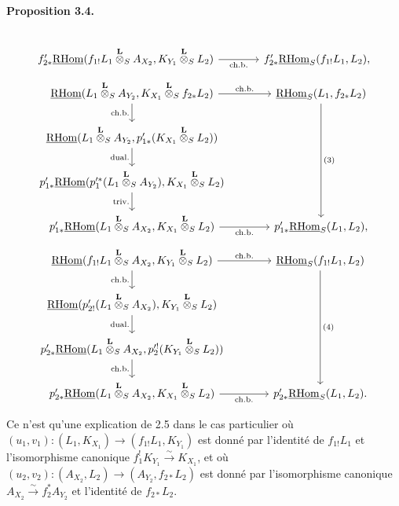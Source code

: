 \documentclass[11pt]{article}
\newenvironment{statement}[1]{\par\medskip\noindent\textbf{#1.}\ }{\par\medskip}
\providecommand{\RHom}{\mathrm{RHom}}
\providecommand{\uRHom}{\underline{\RHom}}
\providecommand{\RHom}{\mathrm{RHom}}
\providecommand{\RHom}{\mathrm R\mathcal{H}om}
\providecommand{\RHom}{\mathrm{RHom}}
\begin{document}
\begin{statement}{Proposition 3.4}
\[\begin{tikzcd}[column sep=3.7em,row sep=1.7em]
& \\
f'_{2*}\uRHom(f_{1!}L_1\overset{\mathbf L}{\otimes}_S A_{X_2},K_{Y_1}\overset{\mathbf L}{\otimes}_S L_2) \arrow[r,"\mathrm{ch.b.}"']
& f'_{2*}\uRHom_S(f_{1!}L_1,L_2),
\end{tikzcd}
\]
\[
\begin{tikzcd}[column sep=3.7em,row sep=1.7em]
\uRHom(L_1\overset{\mathbf L}{\otimes}_S A_{Y_2},K_{X_1}\overset{\mathbf L}{\otimes}_S f_{2*}L_2)
  \arrow[r,"\mathrm{ch.b.}"] \arrow[d,"\mathrm{ch.b.}"']
& \uRHom_S(L_1,f_{2*}L_2) \arrow[ddd,"(3)"] \\
\uRHom(L_1\overset{\mathbf L}{\otimes}_S A_{Y_2},p'_{1*}(K_{X_1}\overset{\mathbf L}{\otimes}_S L_2)) \arrow[d,"\mathrm{dual.}"']
& \\
p'_{1*}\uRHom(p_1'^*(L_1\overset{\mathbf L}{\otimes}_S A_{Y_2}),K_{X_1}\overset{\mathbf L}{\otimes}_S L_2) \arrow[d,"\mathrm{triv.}"']
& \\
p'_{1*}\uRHom(L_1\overset{\mathbf L}{\otimes}_S A_{X_2},K_{X_1}\overset{\mathbf L}{\otimes}_S L_2) \arrow[r,"\mathrm{ch.b.}"']
& p'_{1*}\uRHom_S(L_1,L_2),
\end{tikzcd}
\]
\[
\begin{tikzcd}[column sep=3.7em,row sep=1.7em]
\uRHom(f_{1!}L_1\overset{\mathbf L}{\otimes}_S A_{X_2},K_{Y_1}\overset{\mathbf L}{\otimes}_S L_2)
  \arrow[r,"\mathrm{ch.b.}"] \arrow[d,"\mathrm{ch.b.}"']
& \uRHom_S(f_{1!}L_1,L_2) \arrow[ddd,"(4)"] \\
\uRHom(p'_{2!}(L_1\overset{\mathbf L}{\otimes}_S A_{X_2}),K_{Y_1}\overset{\mathbf L}{\otimes}_S L_2) \arrow[d,"\mathrm{dual.}"']
& \\
p'_{2*}\uRHom(L_1\overset{\mathbf L}{\otimes}_S A_{X_2},p_2'^!(K_{Y_1}\overset{\mathbf L}{\otimes}_S L_2)) \arrow[d,"\mathrm{ch.b.}"']
& \\
p'_{2*}\uRHom(L_1\overset{\mathbf L}{\otimes}_S A_{X_2},K_{X_1}\overset{\mathbf L}{\otimes}_S L_2) \arrow[r,"\mathrm{ch.b.}"']
& p'_{2*}\uRHom_S(L_1,L_2).
\end{tikzcd}
\]
\end{statement}
Ce n'est qu'une explication de 2.5 dans le cas particulier où $(u_1,v_1):(L_1,K_{X_1})\to(f_{1!}L_1,K_{Y_1})$ est donné par l'identité de $f_{1!}L_1$ et l'isomorphisme canonique $f_1^!K_{Y_1}\xrightarrow{\sim}K_{X_1}$, et où $(u_2,v_2):(A_{X_2},L_2)\to(A_{Y_2},f_{2*}L_2)$ est donné par l'isomorphisme canonique $A_{X_2}\xrightarrow{\sim}f_2^*A_{Y_2}$ et l'identité de $f_{2*}L_2$.
\end{document}
